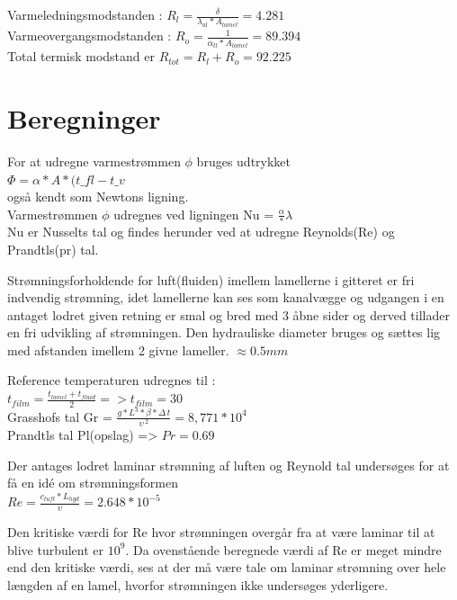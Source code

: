 Varmeledningsmodstanden : $R_l = \frac{\delta}{\lambda_{al}*A_{lamel}} = 4.281$ \\
Varmeovergangsmodstanden : $R_o = \frac{1}{\alpha_{tl}*A_{lamel}} = 89.394$ \\

Total termisk modstand er $R_{tot} = R_l + R_o = 92.225$ \\

\section{Beregninger}

For at udregne varmestrømmen $\phi$  bruges udtrykket \\ $\Phi = \alpha * A* (t\_{fl}-t\_v$ \\  også kendt som Newtons ligning. \\ 

Varmestrømmen $\phi$ udregnes ved ligningen Nu = $\frac{\alpha}*{\lambda}$ \\
Nu er Nusselts tal og findes herunder ved at udregne Reynolds(Re) og Prandtls(pr) tal.

Strømningsforholdende for luft(fluiden) imellem lamellerne i gitteret er fri indvendig strømning, idet lamellerne kan ses som kanalvægge og udgangen i en antaget lodret given retning er smal og bred med 3 åbne sider og derved tillader en fri udvikling af strømningen. Den hydrauliske diameter bruges og sættes lig med afstanden imellem 2 givne lameller. $\approx 0.5 mm$

Reference temperaturen udregnes til : 
\\$t_{film} = \frac{{t_{lamel}}+t_{fluid}}{2} => t_{film}=30$
\\Grasshofs tal Gr = $\frac{g*L^3*\beta*{\Delta\,t}}{\upsilon\,^2} = 8,771*10^4$
\\Prandtls tal Pl(opslag) => $Pr=0.69$

Der antages lodret laminar strømning af luften og Reynold tal undersøges for at få en idé om strømningsformen\\

$Re = \frac{c_{luft}*L_{hyd}}{\upsilon} = 2.648*10^{-5}$

Den kritiske værdi for Re hvor strømningen overgår fra at være laminar til at blive turbulent er $10^9$.  Da ovenstående beregnede værdi af Re er meget mindre end den kritiske værdi, ses at der må være tale om laminar strømning over hele længden af en lamel, hvorfor strømningen ikke undersøges yderligere.

